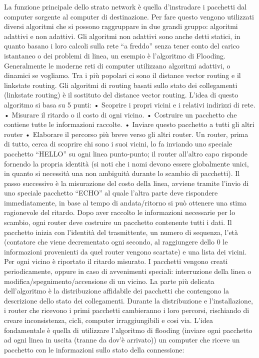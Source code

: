 La funzione principale dello strato network è quella d’instradare i pacchetti dal computer sorgente al computer di destinazione. Per fare questo vengono utilizzati diversi algoritmi che si possono raggruppare in due grandi gruppo: algoritmi adattivi e non adattivi. Gli algoritmi non adattivi sono anche detti statici, in quanto basano i loro calcoli sulla rete “a freddo” senza tener conto del carico istantaneo o dei problemi di linea, un esempio è l’algoritmo di Flooding.
Generalmente le moderne reti di computer utilizzano algoritmi adattivi, o dinamici se vogliamo. Tra i più popolari ci sono il distance vector routing e il linkstate routing.
Gli algoritmi di routing basati sullo stato dei collegamenti (linkstate routing) è il sostituto del distance vector routing. L’idea di questo algoritmo si basa su 5 punti:
•	Scoprire i propri vicini e i relativi indirizzi di rete.
•	Misurare il ritardo o il costo di ogni vicino.
•	Costruire un pacchetto che contiene tutte le informazioni raccolte.
•	Inviare questo pacchetto a tutti gli altri router
•	Elaborare il percorso più breve verso gli altri router.
Un router, prima di tutto, cerca di scoprire chi sono i suoi vicini, lo fa inviando uno speciale pacchetto “HELLO” su ogni linea punto-punto; il router all’altro capo risponde fornendo la propria identità (si noti che i nomi devono essere globalmente unici, in quanto si necessità una non ambiguità durante lo scambio di pacchetti).
Il passo successivo è la misurazione del costo della linea, avviene tramite l’invio di uno speciale pacchetto “ECHO” al quale l’altra parte deve rispondere immediatamente, in base al tempo di andata/ritorno si può ottenere una stima ragionevole del ritardo.
Dopo aver raccolto le informazioni necessarie per lo scambio, ogni router deve costruire un pacchetto contenente tutti i dati. Il pacchetto inizia con l’identità del trasmittente, un numero di sequenza, l’età (contatore che viene decrementato ogni secondo, al raggiungere dello 0 le informazioni provenienti da quel router vengono scartate) e una lista dei vicini. Per ogni vicino è riportato il ritardo misurato. I pacchetti vengono creati periodicamente, oppure in caso di avvenimenti speciali: interruzione della linea o modifica/spegnimento/accensione di un vicino.
La parte più delicata dell’algoritmo è la distribuzione affidabile dei pacchetti che contengono la descrizione dello stato dei collegamenti. Durante la distribuzione e l’installazione, i router che ricevono i primi pacchetti cambieranno i loro percorsi, rischiando di creare inconsistenza, cicli, computer irraggiungibili e cosi via. L’idea fondamentale è quella di utilizzare l’algoritmo di flooding (inviare ogni pacchetto ad ogni linea in uscita (tranne da dov’è arrivato)) un computer che riceve un pacchetto con le informazioni sullo stato della connessione:
